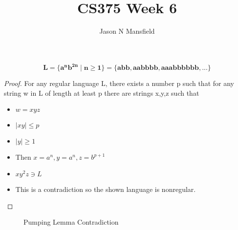 \documentclass[12pt,a4paper,oneside]{report}
\begin{document}
\title{CS375 Week 6}
\author{Jason N Mansfield}
\maketitle
\section{}

$$\mathbf{L =\{a^n b^{2n}\mid n \ge 1\} = \{abb, aabbbb, aaabbbbbb,...\}}$$



\begin{proof}
For any regular language L, there exists a number p such that for any string w in L of length at least p there are strings x,y,z such that
\begin{itemize}
\item $w =  xyz$
\item $\mid xy \mid \le  p$
\item $\mid y \mid \ge 1$
\item Then $x = a^n, y = a^n, z = b^{p+1}$
\item $xy^2z \ni L$
\item This is a contradiction so the shown language is nonregular.
\end{itemize}
\end{proof}

\begin{figure}
\begin{center}
\caption{Pumping Lemma Contradiction}
\end{center}
\end{figure}
\end{document}
